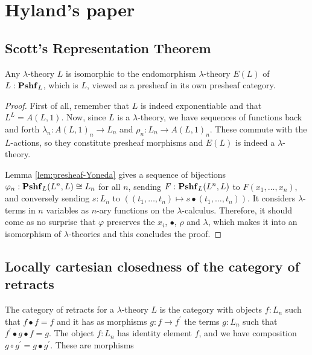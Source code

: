 \chapter{Hyland's paper}


\section{Scott's Representation Theorem}
\begin{theorem}
  Any $ \lambda $-theory $ L $ is isomorphic to the endomorphism $ \lambda $-theory $ E(L) $ of $ L: \mathbf{Pshf}_{L} $, which is $ L $, viewed as a presheaf in its own presheaf category.
\end{theorem}
\begin{proof}
  First of all, remember that $ L $ is indeed exponentiable and that $ L^L = A(L, 1) $.
  Now, since $ L $ is a $ \lambda $-theory, we have sequences of functions back and forth $ \lambda_n: A(L, 1)_n \to L_n $ and $ \rho_n: L_n \to A(L, 1)_n $. These commute with the $ L $-actions, so they constitute presheaf morphisms and $ E(L) $ is indeed a $ \lambda $-theory.

  Lemma \ref{lem:presheaf-Yoneda} gives a sequence of bijections $ \varphi_n : \mathbf{Pshf}_{L}(L^n, L) \cong L_n $ for all $ n $, sending $ F: \mathbf{Pshf}_{L}(L^n, L) $ to $ F(x_1, \dots, x_n) $, and conversely sending $ s: L_n $ to $ ((t_1, \dots, t_n) \mapsto s \bullet (t_1, \dots, t_n)) $. It considers $ \lambda $-terms in $ n $ variables as $ n $-ary functions on the $ \lambda $-calculus. Therefore, it should come as no surprise that $ \varphi $ preserves the $ x_i $, $ \bullet $, $ \rho $ and $ \lambda $, which makes it into an isomorphism of $ \lambda $-theories and this concludes the proof.
\end{proof}


\section{Locally cartesian closedness of the category of retracts}
\begin{definition}
  The category of retracts for a $ \lambda $-theory $ L $ is the category with objects $ f: L_n $ such that $ f \bullet f = f $ and it has as morphisms $ g: f \to f^\prime $ the terms $ g: L_n $ such that $ f^\prime \bullet g \bullet f = g $. The object $ f: L_n $ has identity element $ f $, and we have composition $ g \circ g^\prime = g \bullet g^\prime $. These are morphisms \TODO
\end{definition}

